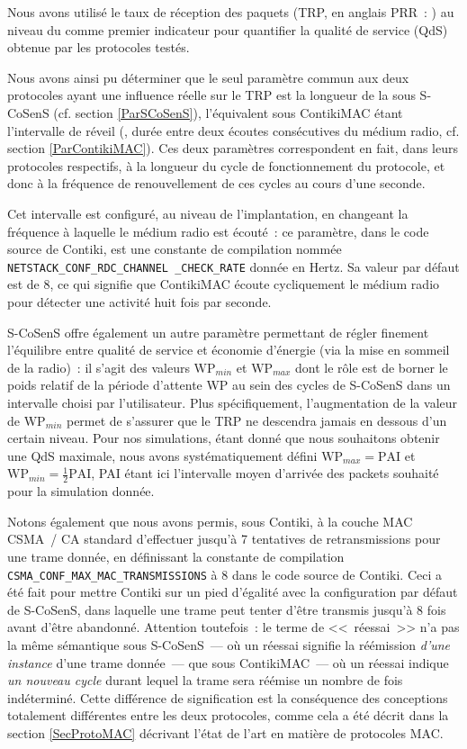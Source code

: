 Nous avons utilisé le taux de réception des paquets (TRP, en anglais PRR~:
) au niveau du  comme premier
indicateur pour quantifier la qualité de service (QdS) obtenue par
les protocoles testés.

Nous avons ainsi pu déterminer que le seul paramètre commun aux deux
protocoles ayant une influence réelle sur le TRP est la longueur de la
 sous S-CoSenS (cf. section \vref{ParSCoSenS}),
l'équivalent sous ContikiMAC étant l'intervalle de réveil (, durée entre deux écoutes consécutives du médium radio,
cf. section \vref{ParContikiMAC}). Ces deux paramètres correspondent
en fait, dans leurs protocoles respectifs, à la longueur du cycle de
fonctionnement du protocole, et donc à la fréquence de renouvellement
de ces cycles au cours d'une seconde.

Cet intervalle est configuré, au niveau de l'implantation, en changeant
la fréquence à laquelle le médium radio est écouté~: ce paramètre, dans
le code source de Contiki, est une constante de compilation nommée
\texttt{NETSTACK\_CONF\_RDC\_CHANNEL \_CHECK\_RATE} donnée en Hertz.
Sa valeur par défaut est de 8, ce qui signifie que ContikiMAC écoute
cycliquement le médium radio pour détecter une activité huit fois
par seconde.

S-CoSenS offre également un autre paramètre permettant de régler finement
l'équilibre entre qualité de service et économie d'énergie (via la mise
en sommeil de la radio)~: il s'agit des valeurs $\mathrm{WP}_{min}$ et
$\mathrm{WP}_{max}$ dont le rôle est de borner le poids relatif de la
période d'attente WP au sein des cycles de S-CoSenS dans un intervalle
choisi par l'utilisateur. Plus spécifiquement, l'augmentation de la
valeur de $\mathrm{WP}_{min}$ permet de s'assurer que le TRP ne
descendra jamais en dessous d'un certain niveau. Pour nos simulations,
étant donné que nous souhaitons obtenir une QdS maximale, nous avons
systématiquement défini $\mathrm{WP}_{max} = \mathrm{PAI}$ et
$\mathrm{WP}_{min} = \frac{1}{2} \mathrm{PAI}$, PAI étant ici l'intervalle
moyen d'arrivée des packets souhaité pour la simulation donnée.

Notons également que nous avons permis, sous Contiki, à la couche MAC
CSMA~/ CA standard d'effectuer jusqu'à 7 tentatives de retransmissions
pour une trame donnée, en définissant la constante de compilation
\texttt{CSMA\_CONF\_MAX\_MAC\_TRANSMISSIONS} à 8 dans le code source
de Contiki. Ceci a été fait pour mettre Contiki sur un pied d'égalité
avec la configuration par défaut de S-CoSenS, dans laquelle une trame
peut tenter d'être transmis jusqu'à 8 fois avant d'être abandonné.
Attention toutefois~: le terme de <<~réessai~>> n'a pas la même sémantique
sous S-CoSenS~--- où un réessai signifie la réémission \emph{d'une instance}
d'une trame donnée~--- que sous ContikiMAC~--- où un réessai indique
\emph{un nouveau cycle} durant lequel la trame sera réémise un nombre
de fois indéterminé. Cette différence de signification est la conséquence
des conceptions totalement différentes entre les deux protocoles,
comme cela a été décrit dans la section \vref{SecProtoMAC} décrivant
l'état de l'art en matière de protocoles MAC.

